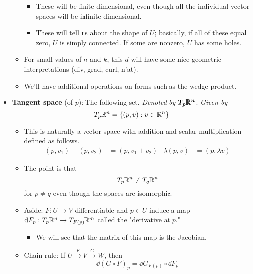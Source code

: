 \documentclass[../notes.tex]{subfiles}
\begin{document}
\begin{itemize}
\begin{itemize}
        \begin{itemize}
            \item These will be finite dimensional, even though all the individual vector spaces will be infinite dimensional.
            \item These will tell us about the shape of $U$; basically, if all of these equal zero, $U$ is simply connected. If some are nonzero, $U$ has some holes.
        \end{itemize}
        \item For small values of $n$ and $k$, this $d$ will have some nice geometric interpretations (div, grad, curl, n'at).
        \item We'll have additional operations on forms such as the wedge product.
    \end{itemize}
    \item \textbf{Tangent space} (of $p$): The following set. \emph{Denoted by} $\bm{T_p\pmb{\mathbb{R}}^n}$. \emph{Given by}
    \begin{equation*}
        T_p\mathbb{R}^n = \{(p,v):v\in\mathbb{R}^n\}
    \end{equation*}
    \begin{itemize}
        \item This is naturally a vector space with addition and scalar multiplication defined as follows.
        \begin{align*}
            (p,v_1)+(p,v_2) &= (p,v_1+v_2)&
            \lambda(p,v) &= (p,\lambda v)
        \end{align*}
        \item The point is that
        \begin{equation*}
            T_p\mathbb{R}^n \neq T_q\mathbb{R}^n
        \end{equation*}
        for $p\neq q$ even though the spaces are isomorphic.
        \item Aside: $F:U\to V$ differentiable and $p\in U$ induce a map $\dd{F_p}:T_p\mathbb{R}^n\to T_{F(p)}\mathbb{R}^m$ called the "derivative at $p$."
        \begin{itemize}
            \item We will see that the matrix of this map is the Jacobian.
        \end{itemize}
        \item Chain rule: If $U\xrightarrow{F}V\xrightarrow{G}W$, then
        \begin{equation*}
            \dd{(G\circ F)_p} = \dd{G}_{F(p)}\circ\dd{F_p}
        \end{equation*}
    \end{itemize}

\end{itemize}
\end{document}
